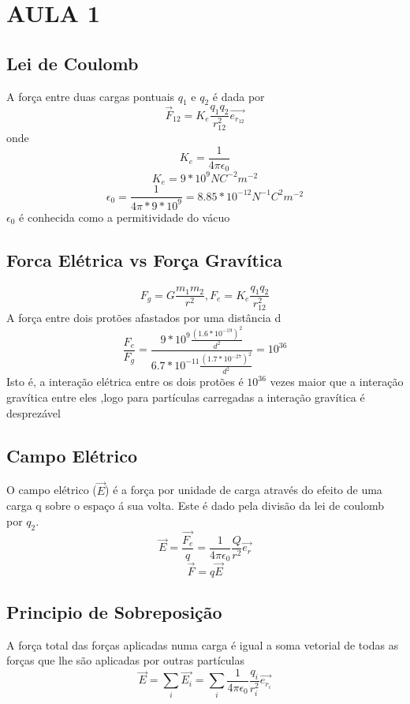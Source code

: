 \documentclass[a4paper]{article}
\begin{document}
 

\section{AULA 1}

\subsection{Lei de Coulomb}
\begin{center}
\end{center}

A força entre duas cargas pontuais $q_{1}$ e $q_{2}$ é dada por
\[ \vec{F}_{12} = K_e \frac{q_1 q_2}{r_{12}^2} \vec{e_{r_{12}}}\] 
onde 
\[K_e=\frac{1}{4\pi\epsilon_0} \]
\[ K_e =9*10^9 NC^{-2}m^{-2} \]
\[ \epsilon_0 = \frac{1}{4\pi*9*10^9} = 8.85*10^{-12} N^{-1}C^2m^{-2}\]
$\epsilon_0$ é conhecida como a permitividade do vácuo


\subsection{Forca Elétrica vs Força Gravítica}
\[F_g = G \frac{m_1m_2}{r^2},     F_e = K_e \frac{q_1 q_2}{r_{12}^2}\]
A força entre dois protões afastados por uma distância d
\[\frac{F_e}{F_g}= \frac{9*10^9 \frac{{(1.6*10^{-19})}^2}{d^2}}{6.7*10^{-11} \frac{{(1.7*10^{-27})}^2}{d^2}} = 10^{36}\] 
Isto é, a interação elétrica entre os dois protões é $10^{36}$
 vezes maior que a interação gravítica entre eles
,logo para partículas carregadas a interação gravítica é desprezável

\subsection{Campo Elétrico}
O campo elétrico ($\vec{E}$) é a força por unidade de carga através do 
efeito de uma carga q sobre o espaço á sua volta.
Este é dado pela divisão da lei de coulomb por $q_2$.
\[\vec{E} = \frac{\vec{F_e}}{q} = \frac{1}{4\pi\epsilon_0} \frac{Q}{r^2}\vec{e_r}\]
\[\vec{F}= q\vec{E}\]

\subsection{Principio de Sobreposição}
A força total das forças aplicadas numa carga é igual a soma vetorial 
de todas as forças que lhe são aplicadas por outras partículas
\[ \vec{E} = \sum_{i}^{}\vec{E_i} = \sum_{i}^{} \frac{1}{4\pi\epsilon_0} \frac{q_i}{r_i^2} \vec{e_{r_i}} \]
\end{document}
